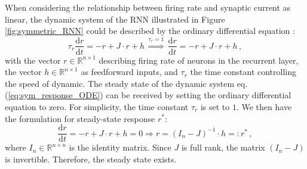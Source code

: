 \documentclass[11pt]{article}
\begin{document}
	When considering the relationship between firing rate and synaptic current as linear, the dynamic system of the RNN illustrated in Figure \ref{fig:symmetric_RNN} could be described by the ordinary differential equation  \cite{dayan2005theoretical}:
		\begin{equation} \label{eq:sym_response_ODE}
			\tau_r \frac{\mathrm{d} r}{\mathrm{d} t} = -r + J \cdot r + h \,  \overset{\tau_r = 1}{\Rightarrow} \, \frac{\mathrm{d} r}{\mathrm{d} t} = -r + J \cdot r + h\, , 
		\end{equation}
	with the vector $r \in \mathbb{R}^{n \times 1}$ describing firing rate of neurons in the recurrent layer, the vector $h \in \mathbb{R}^{n \times 1}$ as feedforward inputs, and $\tau_r$ the time constant controlling the speed of dynamic. 
	The steady state of the dynamic system eq.(\ref{eq:sym_response_ODE}) can be received by setting the ordinary differential equation to zero. For simplicity, the time constant $\tau_r$ is set to $1$. We then have the formulation for steady-state response $r^*$:
		\begin{equation} \label{eq:steady_state}
			\frac{\mathrm{d} r}{\mathrm{d} t} = -r + J \cdot r + h = 0 \Rightarrow r = (I_n - J)^{-1} \cdot h =: r^* \, ,
		\end{equation}
	where $I_n \in \mathbb{R}^{n \times n}$ is the identity matrix. Since $J$ is full rank, the matrix $(I_n - J)$ is invertible. Therefore, the steady state exists.
	
\end{document}
